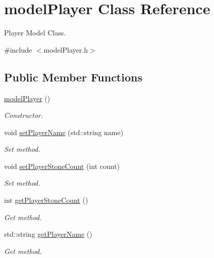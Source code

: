 \hypertarget{classmodelPlayer}{\section{model\+Player Class Reference}
\label{classmodelPlayer}
}


Player Model Class.  




{\ttfamily \#include $<$model\+Player.\+h$>$}

\subsection*{Public Member Functions}
\begin{DoxyCompactItemize}
\item 
\hypertarget{classmodelPlayer_ab8c84fe873effa3932e79fa63aff6c2b}{\hyperlink{classmodelPlayer_ab8c84fe873effa3932e79fa63aff6c2b}{model\+Player} ()}\label{classmodelPlayer_ab8c84fe873effa3932e79fa63aff6c2b}

\begin{DoxyCompactList}\small\item\em Constructor. \end{DoxyCompactList}\item 
void \hyperlink{classmodelPlayer_a7a11f24a73e9a3543983bcf7331edf66}{set\+Player\+Name} (std\+::string name)
\begin{DoxyCompactList}\small\item\em Set method. \end{DoxyCompactList}\item 
void \hyperlink{classmodelPlayer_ae0ea4cf9d1841c40e61ec36c00e873d2}{set\+Player\+Stone\+Count} (int count)
\begin{DoxyCompactList}\small\item\em Set method. \end{DoxyCompactList}\item 
int \hyperlink{classmodelPlayer_a499250a519706a638f946aacb14f2f0f}{get\+Player\+Stone\+Count} ()
\begin{DoxyCompactList}\small\item\em Get method. \end{DoxyCompactList}\item 
std\+::string \hyperlink{classmodelPlayer_a37da9f1b43a182b33b65073be0ea61dd}{get\+Player\+Name} ()
\begin{DoxyCompactList}\small\item\em Get method. \end{DoxyCompactList}\end{DoxyCompactItemize}


